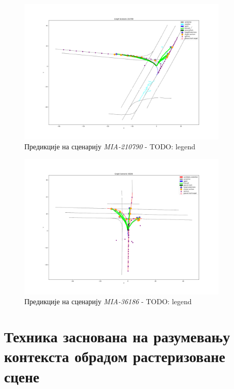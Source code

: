 \documentclass[11pt,oneside]{memoir}
\begin{document}
\begin{figure}[H]
  \centering
  \includegraphics[width=0.9\textwidth]{images/result_MIA_210790_scenario.png}
  \caption{Предикције на сценарију \textit{MIA-210790} \label{tnt-MIA-210790} - TODO: legend}
\end{figure}

\begin{figure}[H]
  \centering
  \includegraphics[width=0.9\textwidth]{images/result_PIT_36186_scenario.png}
  \caption{Предикције на сценарију \textit{MIA-36186} \label{tnt-MIA-36186} - TODO: legend}
\end{figure}

\chapter{Техника заснована на разумевању контекста обрадом растеризоване сцене}
\label{chp:razrada}
\end{document}
